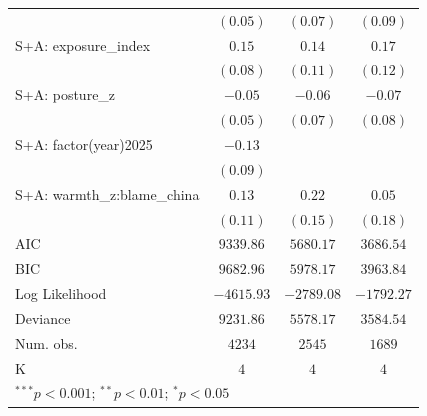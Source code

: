 \begin{tabular}{l c c c}
                                       & $(0.05)$      & $(0.07)$      & $(0.09)$      \\
S+A: exposure\_index                   & $0.15$        & $0.14$        & $0.17$        \\
                                       & $(0.08)$      & $(0.11)$      & $(0.12)$      \\
S+A: posture\_z                        & $-0.05$       & $-0.06$       & $-0.07$       \\
                                       & $(0.05)$      & $(0.07)$      & $(0.08)$      \\
S+A: factor(year)2025                  & $-0.13$       &               &               \\
                                       & $(0.09)$      &               &               \\
S+A: warmth\_z:blame\_china            & $0.13$        & $0.22$        & $0.05$        \\
                                       & $(0.11)$      & $(0.15)$      & $(0.18)$      \\
\hline
AIC                                    & $9339.86$     & $5680.17$     & $3686.54$     \\
BIC                                    & $9682.96$     & $5978.17$     & $3963.84$     \\
Log Likelihood                         & $-4615.93$    & $-2789.08$    & $-1792.27$    \\
Deviance                               & $9231.86$     & $5578.17$     & $3584.54$     \\
Num. obs.                              & $4234$        & $2545$        & $1689$        \\
K                                      & $4$           & $4$           & $4$           \\
\hline
\multicolumn{4}{l}{\scriptsize{$^{***}p<0.001$; $^{**}p<0.01$; $^{*}p<0.05$}}
\end{tabular}
